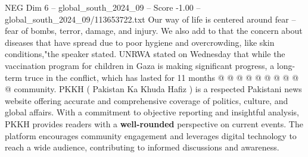 \begin{textsample}{NEG Dim 6 – global\_south\_2024\_09 – Score -1.00 – global\_south\_2024\_09/113653722.txt}
Our way of life is centered around fear -- fear of bombs, terror, damage, and injury.
We also add to that the concern about diseases that have spread due to poor hygiene and overcrowding, like skin conditions,"the speaker stated.
UNRWA stated on Wednesday that while the vaccination program for children in Gaza is making significant progress, a long-term truce in the conflict, which has lasted for 11 months @ @ @ @ @ @ @ @ @ @ community.
PKKH ( Pakistan Ka Khuda Hafiz ) is a respected Pakistani news website offering accurate and comprehensive coverage of politics, culture, and global affairs.
With a commitment to objective reporting and insightful analysis, PKKH provides readers with a \textbf{well-rounded} perspective on current events.
The platform encourages community engagement and leverages digital technology to reach a wide audience, contributing to informed discussions and awareness.

\end{textsample}

